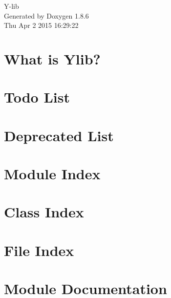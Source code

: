 \documentclass[twoside]{book}
\newcommand{\clearemptydoublepage}{%
  \newpage{\pagestyle{empty}\cleardoublepage}%
}
\begin{document}
\hypersetup{pageanchor=false}
\begin{titlepage}
\vspace*{7cm}
\begin{center}%
{\Large Y-\/lib }\\
\vspace*{1cm}
{\large Generated by Doxygen 1.8.6}\\
\vspace*{0.5cm}
{\small Thu Apr 2 2015 16:29:22}\\
\end{center}
\end{titlepage}
\clearemptydoublepage
\tableofcontents
\clearemptydoublepage
{}
\hypersetup{pageanchor=true}

\chapter{What is Ylib?}
\label{md__r_e_a_d_m_e}
\hypertarget{md__r_e_a_d_m_e}{}

\chapter{Todo List}
\label{todo}
\hypertarget{todo}{}

\chapter{Deprecated List}
\label{deprecated}
\hypertarget{deprecated}{}

\chapter{Module Index}

\chapter{Class Index}

\chapter{File Index}

\chapter{Module Documentation}










\end{document}
